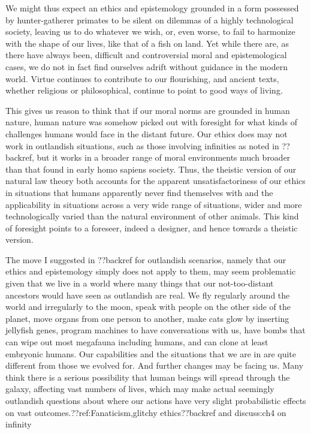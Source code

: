 We might thus expect an ethics and epistemology grounded in a form possessed by hunter-gatherer primates
to be silent on dilemmas of a highly technological society, leaving us to do whatever we wish, or, even worse, 
to fail to harmonize with the shape of our lives, like that of a fish on land. Yet while there are, as there 
have always been, difficult and controversial moral and epistemological cases, we do not in fact find 
ourselves adrift without guidance in the modern world. Virtue continues to contribute to our flourishing,
and ancient texts, whether religious or philosophical, continue to point to good ways of living. 

This gives us reason to think that if our moral norms are grounded in human nature, human nature was somehow
picked out with foresight for what kinds of challenges humans would face in the distant future. Our ethics
does may not work in outlandish situations, such as those involving infinities as noted in ??backref, but it works in a
broader range of moral environments much broader than that found in early homo sapiens society. Thus, the theistic
version of our natural law theory both accounts for the apparent unsatisfactoriness of our ethics in situations that
humans apparently never find themselves with and the applicability in situations across a very wide range of situations,
wider and more technologically varied than the natural environment of other animals. This kind of foresight points to
a foreseer, indeed a designer, and hence towards a theistic version.

The move I suggested in ??backref for outlandish scenarios, namely that our ethics and epistemology simply does not apply
to them, may seem problematic given that we live in a world where many things that our not-too-distant ancestors would have
seen as outlandish are real. We fly regularly around the world and irregularly to the moon, speak with people on the other
side of the planet, move organs from one person to another, make cats glow by inserting jellyfish genes, program machines 
to have conversations with us, have bombs that can wipe out most megafauna including humans, and can clone at least embryonic 
humans. Our capabilities and the situations that we are in are quite different from those we evolved for. And further changes
may be facing us. Many think there is a serious possibility that human beings will spread through the galaxy, affecting vast 
numbers of lives, which may make actual seemingly outlandish questions about where our actions have very slight probabilistic 
effects on vast outcomes.??ref:Fanaticism,glitchy ethics??backref and discuss:ch4 on infinity

